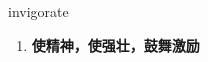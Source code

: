 
\begin{frame}
{\huge invigorate}
\begin{center}
\begin{enumerate}\Large
  \item \textbf{使精神，使强壮，鼓舞激励}
\end{enumerate}
\end{center}
\end{frame}
